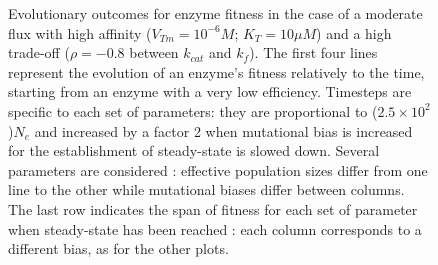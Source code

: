 \begin{figure}[H]
\begin{center}
\vspace{-0.1cm}
\caption{\small Evolutionary outcomes for enzyme fitness in the case of a moderate flux with high affinity ($V_{Tm}=10^{-6}M$; $K_T=10\mu M$) and a high trade-off ($\rho=-0.8$ between $k_{cat}$ and $k_f$). The first four lines represent the evolution of an enzyme's fitness relatively to the time, starting from an enzyme with a very low efficiency. Timesteps are specific to each set of parameters: they are proportional to ($2.5\times 10^2$)$N_e$ and increased by a factor 2 when mutational bias is increased for the establishment of steady-state is slowed down. Several parameters are considered : effective population sizes differ from one line to the other while mutational biases differ between columns. The last row indicates the span of fitness for each set of parameter when steady-state has been reached : each column corresponds to a different bias, as for the other plots.\normalsize}
\label{fig6b-ann}
\end{center}
\end{figure}

